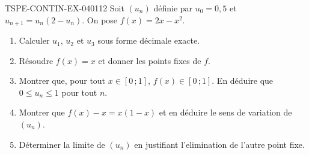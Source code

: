 \begin{exercice}{TSPE-CONTIN-EX-040}{1}{12}
Soit $(u_n)$ définie par $u_0 = 0{,}5$ et $u_{n+1} = u_n(2 - u_n)$. On pose $f(x) = 2x - x^2$.
\begin{enumerate}
  \item Calculer $u_1$, $u_2$ et $u_3$ sous forme décimale exacte.
  \item Résoudre $f(x) = x$ et donner les points fixes de $f$.
  \item Montrer que, pour tout $x \in [0\,;1]$, $f(x) \in [0\,;1]$. En déduire que $0 \leq u_n \leq 1$ pour tout $n$.
  \item Montrer que $f(x) - x = x(1-x)$ et en déduire le sens de variation de $(u_n)$.
  \item Déterminer la limite de $(u_n)$ en justifiant l'elimination de l'autre point fixe.
\end{enumerate}
\end{exercice}
